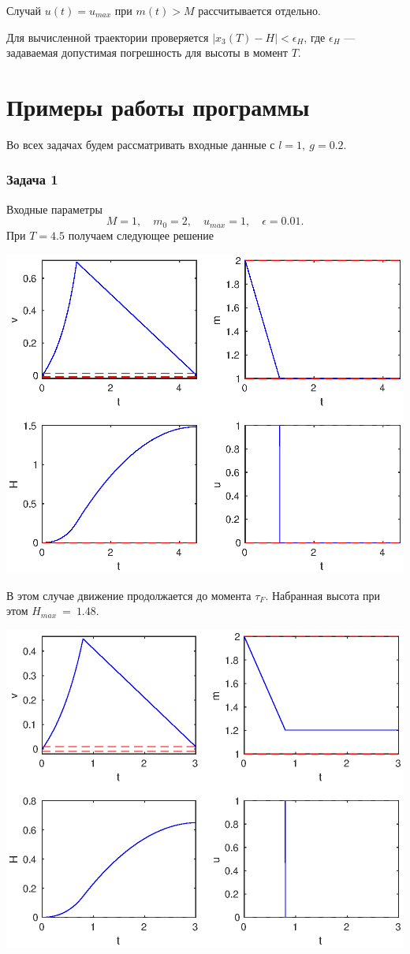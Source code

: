 \documentclass[16pt]{article}
\begin{document}
Случай $u(t) = u_{max}$ при $m(t) > M$ рассчитывается отдельно.

Для вычисленной траектории проверяется $|x_3(T) - H| < \epsilon_H$, где $\epsilon_H$ --- задаваемая допустимая 
погрешность для высоты в момент $T$. 
\newpage
\part{Примеры работы программы}
\setcounter{section}{0}

Во всех задачах будем рассматривать входные данные с $l = 1, \ g = 0.2$.

\section{Задача 1}
Входные  параметры 
$$M = 1, \quad m_0 = 2, \quad u_{max} = 1, \quad \epsilon = 0.01.$$
При $T = 4.5$ получаем следующее решение

\includegraphics[width=160mm]{p1_max.eps}

В этом случае движение продолжается до момента $\tau_F$. Набранная высота при этом $H_{max}~=~1.48$.

\includegraphics[width=160mm]{p1_sw.eps}
\end{document}
